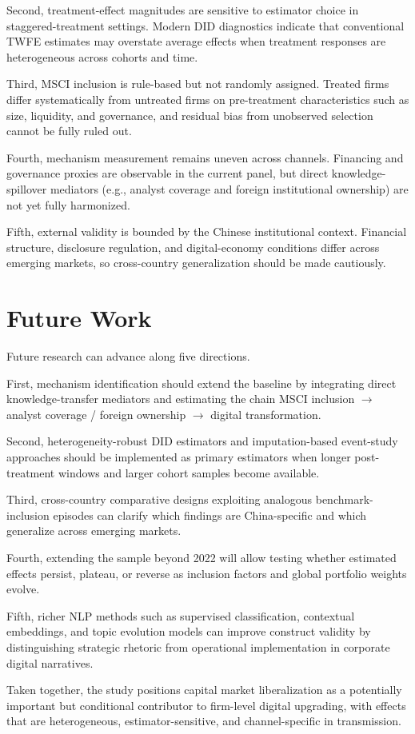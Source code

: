 Second, treatment-effect magnitudes are sensitive to estimator choice in staggered-treatment settings. Modern DID diagnostics indicate that conventional TWFE estimates may overstate average effects when treatment responses are heterogeneous across cohorts and time.

Third, MSCI inclusion is rule-based but not randomly assigned. Treated firms differ systematically from untreated firms on pre-treatment characteristics such as size, liquidity, and governance, and residual bias from unobserved selection cannot be fully ruled out.

Fourth, mechanism measurement remains uneven across channels. Financing and governance proxies are observable in the current panel, but direct knowledge-spillover mediators (e.g., analyst coverage and foreign institutional ownership) are not yet fully harmonized.

Fifth, external validity is bounded by the Chinese institutional context. Financial structure, disclosure regulation, and digital-economy conditions differ across emerging markets, so cross-country generalization should be made cautiously.

\section{Future Work}

Future research can advance along five directions.

First, mechanism identification should extend the baseline by integrating direct knowledge-transfer mediators and estimating the chain MSCI inclusion $\to$ analyst coverage / foreign ownership $\to$ digital transformation.

Second, heterogeneity-robust DID estimators and imputation-based event-study approaches should be implemented as primary estimators when longer post-treatment windows and larger cohort samples become available.

Third, cross-country comparative designs exploiting analogous benchmark-inclusion episodes can clarify which findings are China-specific and which generalize across emerging markets.

Fourth, extending the sample beyond 2022 will allow testing whether estimated effects persist, plateau, or reverse as inclusion factors and global portfolio weights evolve.

Fifth, richer NLP methods such as supervised classification, contextual embeddings, and topic evolution models can improve construct validity by distinguishing strategic rhetoric from operational implementation in corporate digital narratives.

Taken together, the study positions capital market liberalization as a potentially important but conditional contributor to firm-level digital upgrading, with effects that are heterogeneous, estimator-sensitive, and channel-specific in transmission.
